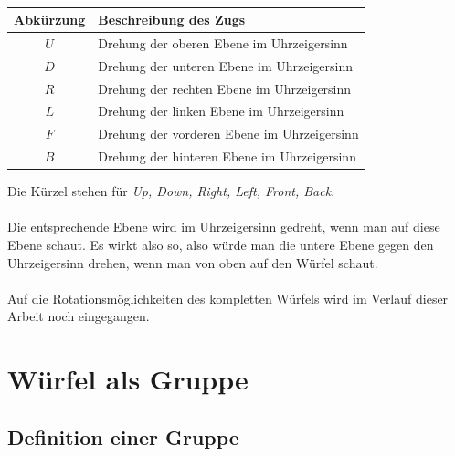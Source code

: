 \documentclass[12pt,a4paper, usenames, dvipsnames]{article}
\begin{document}
\begin{table}[H]
\centering
\begin{tabular}{|c|l|}
\hline
Abkürzung & Beschreibung des Zugs \\
\hline
\hline
$U$ & Drehung der oberen Ebene im Uhrzeigersinn \\
\hline
$D$ & Drehung der unteren Ebene im Uhrzeigersinn \\
\hline
$R$ & Drehung der rechten Ebene im Uhrzeigersinn \\
\hline
$L$ & Drehung der linken Ebene im Uhrzeigersinn \\%
\hline
$F$ & Drehung der vorderen Ebene im Uhrzeigersinn \\
\hline
$B$ & Drehung der hinteren Ebene im Uhrzeigersinn \\
\hline
\end{tabular} 
\caption[Ebenenrotationen]{}
\end{table}

Die Kürzel stehen für \textit{Up, Down, Right, Left, Front, Back}.  \\
\\
Die entsprechende Ebene wird im Uhrzeigersinn gedreht, wenn man auf diese Ebene schaut. Es wirkt also so, also würde man die untere Ebene gegen den Uhrzeigersinn drehen, wenn man von oben auf den Würfel schaut.  \\
\\
Auf die Rotationsmöglichkeiten des kompletten Würfels wird im Verlauf dieser Arbeit noch eingegangen.
\newpage






















\section{Würfel als Gruppe}

\subsection*{Definition einer Gruppe} 
\end{document}
